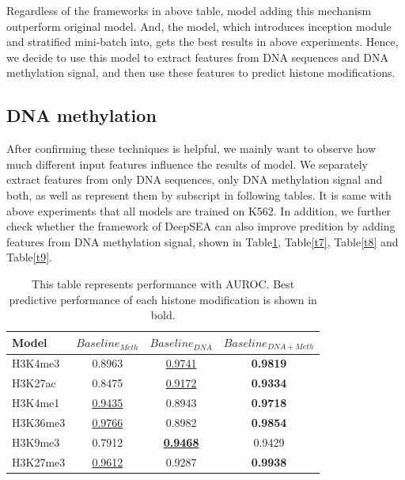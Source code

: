 Regardless of the frameworks in above table, model adding this mechanism outperform original model. And, the model, which introduces inception module and stratified mini-batch into, gets the best results in above experiments. Hence, we decide to use this model to extract features from DNA sequences and DNA methylation signal, and then use these features to predict histone modifications.

\subsection{DNA methylation}
After confirming these techniques is helpful, we mainly want to observe how much different input features influence the results of model. We separately extract features from only DNA sequences, only DNA methylation signal and both, as well as represent them by subscript in following tables. It is same with above experiments that all models are trained on K562. In addition, we further check whether the framework of DeepSEA can also improve predition by adding features from DNA methylation signal, shown in Table\ref{t6}, Table\ref{t7}, Table\ref{t8} and Table\ref{t9}.

\begin{table}[H]%
    \centering
    \begin{tabular}{lccc}
    \hline
    Model & $Baseline_{Meth}$ & $Baseline_{DNA}$ & $Baseline_{DNA+Meth}$ \\\hline
    H3K4me3 & 0.8963 & \underline{0.9741} & \textbf{0.9819} \\
    H3K27ac & 0.8475 & \underline{0.9172} & \textbf{0.9334} \\
    H3K4me1 & \underline{0.9435} & 0.8943 & \textbf{0.9718} \\
    H3K36me3 & \underline{0.9766} & 0.8982 & \textbf{0.9854} \\
    H3K9me3 & 0.7912 & \textbf{\underline{0.9468}} & 0.9429 \\
    H3K27me3 & \underline{0.9612} & 0.9287 & \textbf{0.9938} \\\hline
    \end{tabular}
    \captionsetup{labelfont=bf}
    \renewcommand{\baselinestretch}{1.0}
    \caption[Comparison of different inputs of baseline with AUROC]{This table represents performance with AUROC. Best predictive performance of each histone modification is shown in bold.}
    \label{t6}
\end{table}

